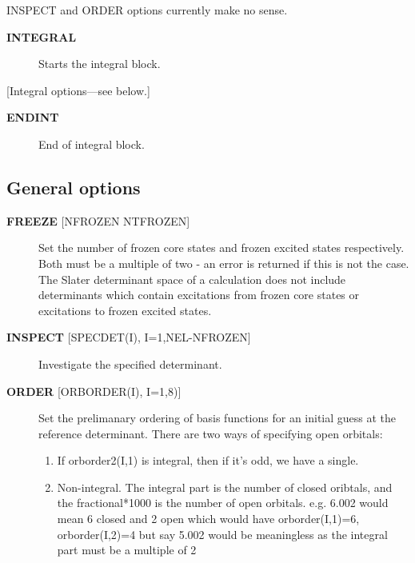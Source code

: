 \documentclass[openany,a4paper,10pt]{manual}
\begin{document}
\begin{notice}[note]
INSPECT and ORDER options currently make no sense.
\end{notice}
\begin{description}
\item[\textbf{INTEGRAL}]
Starts the integral block.

\end{description}

{[}Integral options---see below.{]}
\begin{description}
\item[\textbf{ENDINT}]
End of integral block.

\end{description}


\subsection{General options}
\begin{description}
\item[\textbf{FREEZE} {[}NFROZEN NTFROZEN{]}]
Set the number of frozen core states and frozen excited states
respectively.  Both must be a multiple of two - an error is returned
if this is not the case.  The Slater determinant space of a
calculation does not include determinants which contain excitations from
frozen core states or excitations to frozen excited states.

\item[\textbf{INSPECT} {[}SPECDET(I), I=1,NEL-NFROZEN{]}]
Investigate the specified determinant.

\item[\textbf{ORDER} {[}ORBORDER(I), I=1,8){]}]
Set the prelimanary ordering of basis functions for an initial guess
at the reference determinant.  There are two ways of specifying
open orbitals:
\begin{enumerate}
\item {} 
If orborder2(I,1) is integral, then if it's odd, we have a single.

\item {} 
Non-integral.  The integral part is the number of closed oribtals,
and the fractional*1000 is the number of open orbitals.
e.g. 6.002 would mean 6 closed and 2 open
which would have orborder(I,1)=6, orborder(I,2)=4
but say 5.002 would be meaningless as the integral part must be a
multiple of 2

\end{enumerate}

\end{description}
\end{document}

